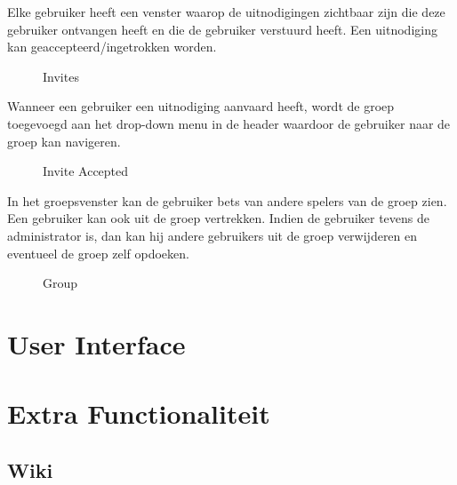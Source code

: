 \documentclass[11pt]{article}
\begin{document}
Elke gebruiker heeft een venster waarop de uitnodigingen zichtbaar zijn die deze gebruiker ontvangen heeft en die de gebruiker verstuurd heeft.  Een uitnodiging kan geaccepteerd/ingetrokken worden.\\

\begin{figure}[h!]
	\begin{center}


	\caption{Invites}
	\label{fig:invites}
	\end{center}
\end{figure}

Wanneer een gebruiker een uitnodiging aanvaard heeft, wordt de groep toegevoegd aan het drop-down menu in de header waardoor de gebruiker naar de groep kan navigeren.\\

\begin{figure}[h!]
	\begin{center}


	\caption{Invite Accepted}
	\label{fig:inviteAccepted}
	\end{center}
\end{figure}

In het groepsvenster kan de gebruiker bets van andere spelers van de groep zien.  Een gebruiker kan ook uit de groep vertrekken.  Indien de gebruiker tevens de administrator is, dan kan hij andere gebruikers uit de groep verwijderen en eventueel de groep zelf opdoeken.\\

\begin{figure}[h!]
	\begin{center}


	\caption{Group}
	\label{fig:group}
	\end{center}
\end{figure}

\section{User Interface}





\section{Extra Functionaliteit}


\subsection{Wiki}
\end{document}
